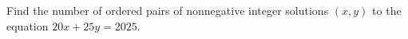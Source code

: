 Find the number of ordered pairs of nonnegative integer solutions $(x, y)$ to the equation $20x + 25y = 2025$.
